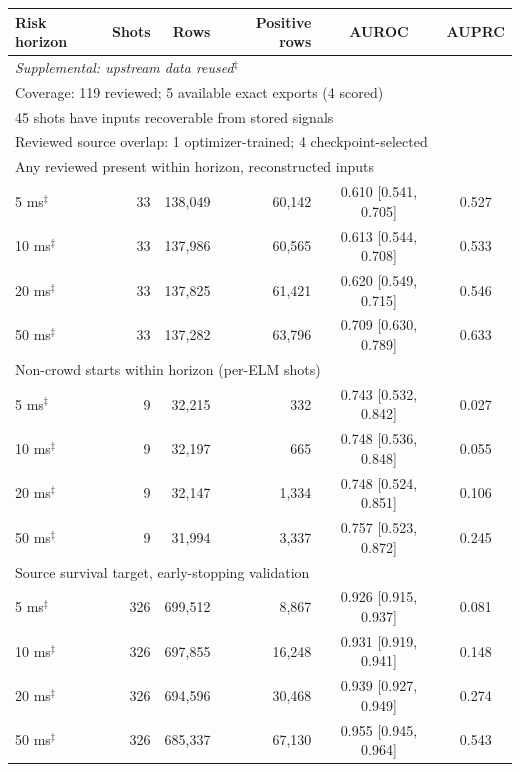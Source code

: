 \begin{table}[t]
\centering
\small
\begin{tabular}{lrrrcc}
\toprule
Risk horizon & Shots & Rows & Positive rows & AUROC & AUPRC \\
\midrule\multicolumn{6}{l}{\emph{Supplemental: upstream data reused$^{\ddagger}$}} \\
\multicolumn{6}{l}{Coverage: 119 reviewed; 5 available exact exports (4 scored)} \\
\multicolumn{6}{l}{45 shots have inputs recoverable from stored signals} \\
\multicolumn{6}{l}{Reviewed source overlap: 1 optimizer-trained; 4 checkpoint-selected} \\
\midrule
\multicolumn{6}{l}{Any reviewed present within horizon, reconstructed inputs} \\
5 ms$^{\ddagger}$ & 33 & 138,049 & 60,142 & 0.610 {\scriptsize[0.541, 0.705]} & 0.527 \\
10 ms$^{\ddagger}$ & 33 & 137,986 & 60,565 & 0.613 {\scriptsize[0.544, 0.708]} & 0.533 \\
20 ms$^{\ddagger}$ & 33 & 137,825 & 61,421 & 0.620 {\scriptsize[0.549, 0.715]} & 0.546 \\
50 ms$^{\ddagger}$ & 33 & 137,282 & 63,796 & 0.709 {\scriptsize[0.630, 0.789]} & 0.633 \\
\midrule
\multicolumn{6}{l}{Non-crowd starts within horizon (per-ELM shots)} \\
5 ms$^{\ddagger}$ & 9 & 32,215 & 332 & 0.743 {\scriptsize[0.532, 0.842]} & 0.027 \\
10 ms$^{\ddagger}$ & 9 & 32,197 & 665 & 0.748 {\scriptsize[0.536, 0.848]} & 0.055 \\
20 ms$^{\ddagger}$ & 9 & 32,147 & 1,334 & 0.748 {\scriptsize[0.524, 0.851]} & 0.106 \\
50 ms$^{\ddagger}$ & 9 & 31,994 & 3,337 & 0.757 {\scriptsize[0.523, 0.872]} & 0.245 \\
\midrule
\multicolumn{6}{l}{Source survival target, early-stopping validation} \\
5 ms$^{\ddagger}$ & 326 & 699,512 & 8,867 & 0.926 {\scriptsize[0.915, 0.937]} & 0.081 \\
10 ms$^{\ddagger}$ & 326 & 697,855 & 16,248 & 0.931 {\scriptsize[0.919, 0.941]} & 0.148 \\
20 ms$^{\ddagger}$ & 326 & 694,596 & 30,468 & 0.939 {\scriptsize[0.927, 0.949]} & 0.274 \\
50 ms$^{\ddagger}$ & 326 & 685,337 & 67,130 & 0.955 {\scriptsize[0.945, 0.964]} & 0.543 \\

\end{tabular}
\end{table}
